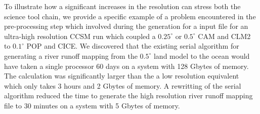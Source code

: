 %
% 

To illustrate how a significant increases in the resolution can stress both the science tool chain, we provide a specific example of a 
problem encountered in the pre-processing step which involved 
during the generation for a input file for an ultra-high resolution 
CCSM run which coupled a $0.25^\circ$ or $0.5^\circ$ CAM and CLM2 to 
$0.1^\circ$ POP and CICE.  We discovered that the existing serial 
algorithm for generating a river runoff mapping from the $0.5^\circ$ 
land model to the ocean would have taken a single processor 60 days 
on a system with 128 Gbytes of memory.  The calculation was significantly 
larger than the a low resolution equivalent which only takes 3 hours 
and 2 Gbytes of memory.  A rewritting of the serial algorithm reduced 
the time to generate the high resolution river runoff mapping file to 
30 minutes on a system with 5 Gbytes of memory.
